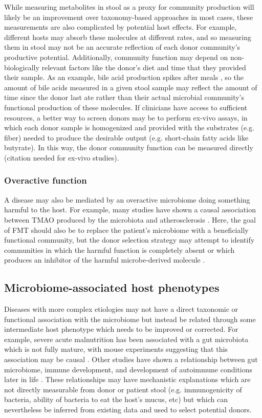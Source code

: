 While measuring metabolites in stool as a proxy for community production will likely be an improvement over taxonomy-based approaches in most cases, these measurements are also complicated by potential host effects.
For example, different hosts may absorb these molecules at different rates, and so measuring them in stool may not be an accurate reflection of each donor community's productive potential.
Additionally, community function may depend on non-biologically relevant factors like the donor's diet and time that they provided their sample. As an example, bile acid production spikes after meals \cite{Hofmann1989}, so the amount of bile acids measured in a given stool sample may reflect the amount of time since the donor last ate rather than their actual microbial community's functional production of these molecules.
If clinicians have access to sufficient resources, a better way to screen donors may be to perform ex-vivo assays, in which each donor sample is homogenized and provided with the substrates (e.g. fiber) needed to produce the desirable output (e.g. short-chain fatty acids like butyrate).
In this way, the donor community function can be measured directly (citation needed for ex-vivo studies).

\subsubsection{Overactive function}

A disease may also be mediated by an overactive microbiome doing something harmful to the host.
For example, many studies have shown a causal association between TMAO produced by the microbiota and atherosclerosis \cite{Koeth2013,Wang2015}.
Here, the goal of FMT should also be to replace the patient's microbiome with a beneficially functional community, but the donor selection strategy may attempt to identify communities in which the harmful function is completely absent or which produces an inhibitor of the harmful microbe-derived molecule \cite{Wang2015}.

\subsection{Microbiome-associated host phenotypes}

Diseases with more complex etiologies may not have a direct taxonomic or functional association with the microbiome but instead be related through some intermediate host phenotype which needs to be improved or corrected.
For example, severe acute malnutrition has been associated with a gut microbiota which is not fully mature, with mouse experiments suggesting that this association may be causal \cite{Blanton2016,Subramanian2014}.
Other studies have shown a relationship between gut microbiome, immune development, and development of autoimmune conditions later in life \cite{Stokholm2018,Cox2014,Kostic2015}.
These relationships may have mechanistic explanations which are not directly measurable from donor or patient stool (e.g. immunogenicity of bacteria, ability of bacteria to eat the host's mucus, etc) but which can nevertheless be inferred from existing data and used to select potential donors.

